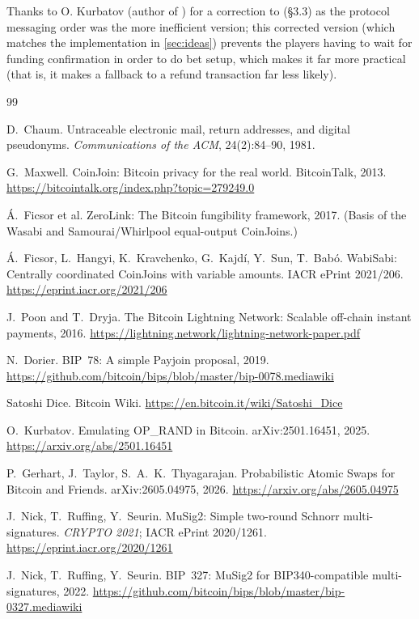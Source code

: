 \documentclass[11pt]{article}
\begin{document}
Thanks to O. Kurbatov (author of \cite{kurbatov2025oprand}) for a correction to (\S3.3) as the protocol messaging order was the more inefficient version; this corrected version (which matches the implementation in \ref{sec:ideas}) prevents the players having to wait for funding confirmation in order to do bet setup, which makes it far more practical (that is, it makes a fallback to a refund transaction far less likely).

\begin{thebibliography}{99}

 D.~Chaum. Untraceable electronic mail, return addresses, and digital pseudonyms. \emph{Communications of the ACM}, 24(2):84--90, 1981.

 G.~Maxwell. CoinJoin: Bitcoin privacy for the real world. BitcoinTalk, 2013. \url{https://bitcointalk.org/index.php?topic=279249.0}

 \'A.~Ficsor et al. ZeroLink: The Bitcoin fungibility framework, 2017. (Basis of the Wasabi and Samourai/Whirlpool equal-output CoinJoins.)

 \'A.~Ficsor, L.~Hangyi, K.~Kravchenko, G.~Kajd\'i, Y.~Sun, T.~Bab\'o. WabiSabi: Centrally coordinated CoinJoins with variable amounts. IACR ePrint 2021/206. \url{https://eprint.iacr.org/2021/206}

 J.~Poon and T.~Dryja. The Bitcoin Lightning Network: Scalable off-chain instant payments, 2016. \url{https://lightning.network/lightning-network-paper.pdf}

 N.~Dorier. BIP~78: A simple Payjoin proposal, 2019. \url{https://github.com/bitcoin/bips/blob/master/bip-0078.mediawiki}

 Satoshi Dice. Bitcoin Wiki. \url{https://en.bitcoin.it/wiki/Satoshi_Dice}

 O.~Kurbatov. Emulating OP\_RAND in Bitcoin. arXiv:2501.16451, 2025. \url{https://arxiv.org/abs/2501.16451}

 P.~Gerhart, J.~Taylor, S.~A.~K.~Thyagarajan. Probabilistic Atomic Swaps for Bitcoin and Friends. arXiv:2605.04975, 2026. \url{https://arxiv.org/abs/2605.04975}

 J.~Nick, T.~Ruffing, Y.~Seurin. MuSig2: Simple two-round Schnorr multi-signatures. \emph{CRYPTO 2021}; IACR ePrint 2020/1261. \url{https://eprint.iacr.org/2020/1261}

 J.~Nick, T.~Ruffing, Y.~Seurin. BIP~327: MuSig2 for BIP340-compatible multi-signatures, 2022. \url{https://github.com/bitcoin/bips/blob/master/bip-0327.mediawiki}


\end{thebibliography}
\end{document}
